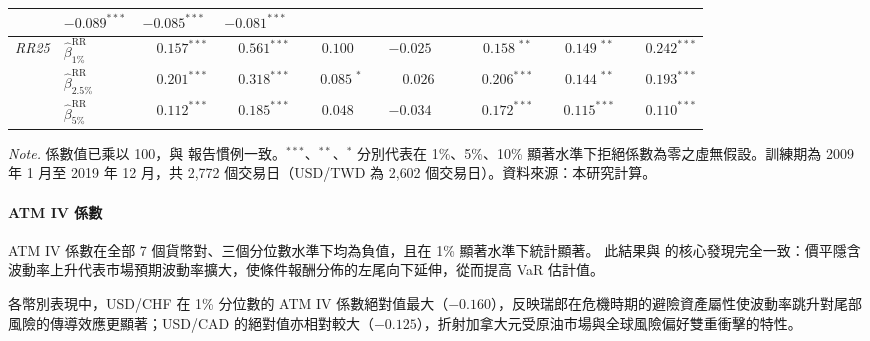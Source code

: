 \begin{table}[htbp]
{\begin{tabular}{llccccccc}
            & $-0.089^{***}$
            & $-0.085^{***}$
            & $-0.081^{***}$ \\
        \hline
        \multirow{3}{*}{\textit{RR25}}
          & $\hat\beta^{\mathrm{RR}}_{1\%}$
            & $\phantom{-}0.157^{***}$
            & $\phantom{-}0.561^{***}$
            & $\phantom{-}0.100^{\ \phantom{**}}$
            & $-0.025^{\ \phantom{**}}$
            & $\phantom{-}0.158^{\ **}$
            & $\phantom{-}0.149^{\ **}$
            & $\phantom{-}0.242^{***}$ \\
          & $\hat\beta^{\mathrm{RR}}_{2.5\%}$
            & $\phantom{-}0.201^{***}$
            & $\phantom{-}0.318^{***}$
            & $\phantom{-}0.085^{\ *\phantom{*}}$
            & $\phantom{-}0.026^{\ \phantom{**}}$
            & $\phantom{-}0.206^{***}$
            & $\phantom{-}0.144^{\ **}$
            & $\phantom{-}0.193^{***}$ \\
          & $\hat\beta^{\mathrm{RR}}_{5\%}$
            & $\phantom{-}0.112^{***}$
            & $\phantom{-}0.185^{***}$
            & $\phantom{-}0.048^{\ \phantom{**}}$
            & $-0.034^{\ \phantom{**}}$
            & $\phantom{-}0.172^{***}$
            & $\phantom{-}0.115^{***}$
            & $\phantom{-}0.110^{***}$ \\
        \hline
    \end{tabular}
    } %

    \vspace{3mm}

    \begin{minipage}{\textwidth}
        \fontsize{9pt}{13pt}\selectfont
        \textit{Note.} 係數值已乘以 100，與 \citet{de2022estimating} 報告慣例一致。$^{***}$、$^{**}$、$^{*}$ 分別代表在 1\%、5\%、10\% 顯著水準下拒絕係數為零之虛無假設。訓練期為 2009 年 1 月至 2019 年 12 月，共 2{,}772 個交易日（USD/TWD 為 2{,}602 個交易日）。資料來源：本研究計算。
    \end{minipage}
\end{table}

\paragraph{ATM IV 係數}

ATM IV 係數在全部 7 個貨幣對、三個分位數水準下均為負值，且在 1\% 顯著水準下統計顯著。
此結果與 \citet{de2022estimating} 的核心發現完全一致：價平隱含波動率上升代表市場預期波動率擴大，使條件報酬分佈的左尾向下延伸，從而提高 VaR 估計值。

各幣別表現中，USD/CHF 在 1\% 分位數的 ATM IV 係數絕對值最大（$-0.160$），反映瑞郎在危機時期的避險資產屬性使波動率跳升對尾部風險的傳導效應更顯著；USD/CAD 的絕對值亦相對較大（$-0.125$），折射加拿大元受原油市場與全球風險偏好雙重衝擊的特性。

